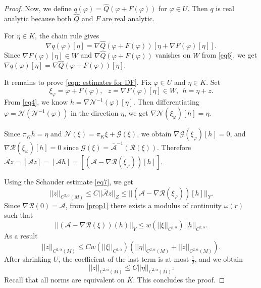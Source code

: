 \documentclass[12pt]{amsart}
\newcommand{\vphi}{\varphi}
\newcommand{\na}{{\nabla}}
\begin{document}
\begin{proof}
    Now, we define $q(\vphi)=\hat{Q}(\vphi +F(\vphi))$ for $\vphi \in U$. Then $q$ is real analytic because both $\hat{Q}$ and $F$ are real analytic.

    For $\eta \in K$, the chain rule gives
    \begin{equation}
        \na q(\vphi)[\eta] =\na \hat{Q}(\vphi +F(\vphi))[\eta +\na F(\vphi)[\eta]].
    \end{equation}
    Since $\na F(\vphi)[\eta] \in W$ and $\na \hat{Q}(\vphi +F(\vphi)) $ vanishes on $W$ from \eqref{eq6}, we get $\na q(\vphi)[\eta]= \na \hat{Q}(\vphi +F(\vphi))[\eta]$.

    It remains to prove \eqref{eqn: estimates for DF}. Fix $\vphi \in U$ and $\eta \in K$. Set
    \begin{equation}
        \xi_\vphi = \vphi +F(\vphi),~~~z =\na F(\vphi)[\eta] \in W,~~ h=\eta +z.
    \end{equation}
    From \eqref{eq4}, we know $h=\na \mathcal{N}^{-1}(\vphi)[\eta ]$. Then differentiating $\vphi = \mathcal{N}(\mathcal{N}^{-1}(\vphi))$ in the direction $\eta$, we get $\na \mathcal{N}(\xi_\vphi)[h]=\eta$.

    Since $\pi_K h =\eta $ and $\mathcal{N}(\xi)= \pi _K \xi + \mathcal{G}(\xi)$, we obtain $\na \mathcal{G}(\xi_\vphi)[h]=0$, and $\na \mathcal{R}(\xi_\vphi)[h]=0$ since $\mathcal{G}(\xi)= \bar{\mathcal{A}}^{-1}(\mathcal{R}(\xi))$. Therefore $\bar{\mathcal{A}}z =[\mathcal{A}z] = [\mathcal{A}h]
    =[(\mathcal{A}-\na \mathcal{R}(\xi_\vphi))[h]]$. 

    Using the Schauder estimate \eqref{eq7}, we get
    \begin{equation}
        ||z||_{C^{2,\alpha}(M)} \leq C ||\bar{\mathcal{A}}z||_Z  \leq ||(\mathcal{A}-\na \mathcal{R}(\xi_\vphi))[h]|| _Y.
    \end{equation}
    Since  $\na \mathcal{R}(0) =\mathcal{A}$, from \eqref{prop1} there exists a modulus of continuity $\omega(r)$ such that
    \begin{equation}
        ||(\mathcal{A}-\na \mathcal{R}(\xi))(h)||_Y\leq w(||\xi||_{C^{2,\alpha}})||h||_{C^{2,\alpha}}.
    \end{equation}
    As a result 
    \begin{equation}
        ||z||_{C^{2,\alpha}(M)} \leq C w(||\xi||_{C^{2,\alpha}}) (||\eta||_{C^{2,\alpha}(M)} +||z||_{C^{2,\alpha}(M)}).
    \end{equation}
    After shrinking $U$, the coefficient of the last term is at most $\frac{1}{2}$, and we obtain
    \begin{equation}
        ||z||_{C^{2,\alpha}(M)} \leq C ||\eta||_{C^{2,\alpha}(M)} .
    \end{equation}
    Recall that all norms are equivalent on $K$. This concludes the proof.
\end{proof}
    
\end{document}
